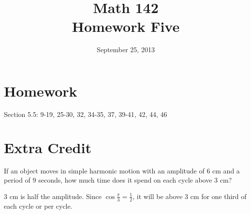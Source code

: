 \documentclass{exam}
\author{}
\date{September 25, 2013}
\title{Math 142 \\ Homework Five}
\begin{document}
  \maketitle

  \section{Homework}
  Section 5.5: 9-19, 25-30, 32, 34-35, 37, 39-41, 42, 44, 46

  \section{Extra Credit}
  If an object moves in simple harmonic motion with an amplitude of 6 cm and a period of 9 seconds, how much time does
  it spend on each cycle above 3 cm?

  \begin{solution}
    3 cm is half the amplitude.  Since $\cos \frac{\pi}{3} = \frac{1}{2}$, it will be above 3 cm for one third of each
      cycle or  per cycle.
  \end{solution}

  \ifprintanswers
\end{document}

